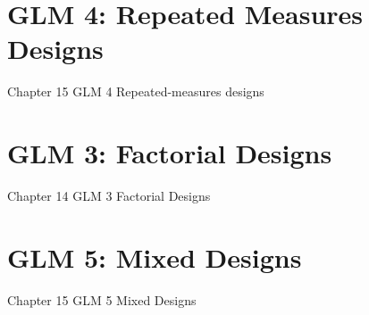 \documentclass[a4paper, 12pt]{book}
\begin{document}
\chapter{GLM 4: Repeated Measures Designs}
{Chapter 15 GLM 4 Repeated-measures designs}

\chapter{GLM 3: Factorial Designs}
{Chapter 14 GLM 3 Factorial Designs}


\chapter{GLM 5: Mixed Designs}
{Chapter 15 GLM 5 Mixed Designs}
\end{document}
